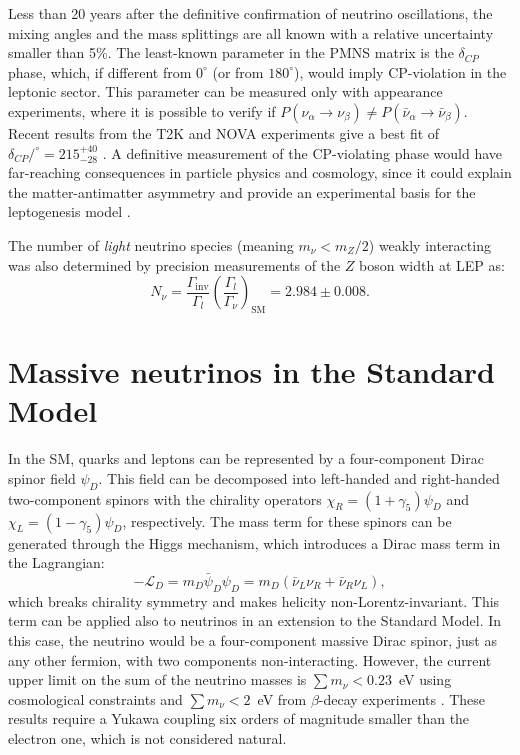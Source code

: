 Less than 20 years after the definitive confirmation of neutrino oscillations, the mixing angles and the mass splittings are all known with a relative uncertainty smaller than 5\%. The least-known parameter in the PMNS matrix is the $\delta_{CP}$ phase, which, if different from $0^{\circ}$ (or from $180^{\circ}$), would imply CP-violation in the leptonic sector. This parameter can be measured only with appearance experiments, where it is possible to verify if
$P(\nu_{\alpha}\rightarrow\nu_{\beta}) \neq P(\bar{\nu}_{\alpha}\rightarrow\bar{\nu}_{\beta})$. Recent results from the T2K and NOVA experiments give a best fit of $\delta_{CP}/^{\circ}=215^{+40}_{-28}$ \cite{Esteban:2018azc}. A definitive measurement of the CP-violating phase would have far-reaching consequences in particle physics and cosmology, since it could explain the matter-antimatter asymmetry and provide an experimental basis for the leptogenesis model \cite{Fukugita:1986hr}.

The number of \emph{light} neutrino species (meaning $m_{\nu} < m_{Z}/2$) weakly interacting  was also determined by precision measurements of the $Z$ boson width at LEP as:
\begin{equation}
   N_{\nu} = \frac{\Gamma_{\mathrm{inv}}}{\Gamma_l}
   \left(\frac{\Gamma_{l}}{\Gamma_{\nu}}\right)_{\mathrm{SM}}=2.984\pm0.008.
\end{equation}

\section{Massive neutrinos in the Standard Model}
In the SM, quarks and leptons can be represented by a four-component Dirac spinor field $\psi_{D}$. This field can be decomposed into left-handed and right-handed two-component spinors with the chirality operators $\chi_{R} = (1+\gamma_5)\psi_D$ and $\chi_{L} = (1-\gamma_5)\psi_D$, respectively. The mass term for these spinors can be generated through the Higgs mechanism, which introduces a Dirac mass term in the Lagrangian:
\begin{equation}
    -\mathcal{L}_D = m_D\bar{\psi}_D\psi_D = m_D(\bar{\nu}_L\nu_R + \bar{\nu}_R\nu_L),
\end{equation}
which breaks chirality symmetry and makes helicity non-Lorentz-invariant.
This term can be applied also to neutrinos in an extension to the Standard Model. In this case, the neutrino would be a four-component massive Dirac spinor, just as any other fermion, with two components non-interacting.
However, the current upper limit on the sum of the neutrino masses is $\sum m_{\nu} < 0.23$~eV using cosmological constraints \cite{Ade:2015xua} and $\sum m_{\nu} < 2$~eV from $\beta$-decay experiments \cite{Otten:2008zz}. These results require a Yukawa coupling six orders of magnitude smaller than the electron one, which is not considered natural.

